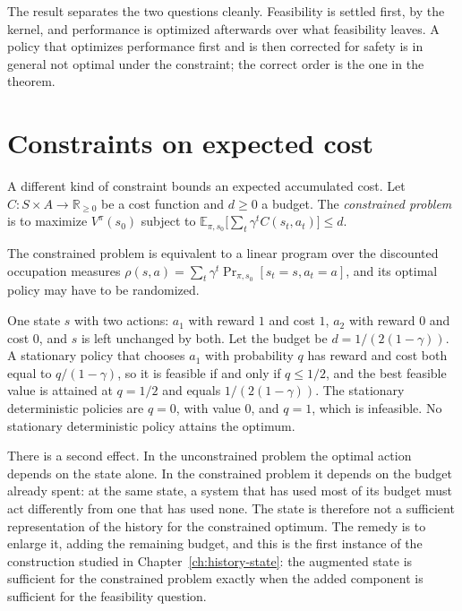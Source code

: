 The result separates the two questions cleanly. Feasibility is settled first, by the kernel, and performance is optimized afterwards over what feasibility leaves. A policy that optimizes performance first and is then corrected for safety is in general not optimal under the constraint; the correct order is the one in the theorem.

\section{Constraints on expected cost}

A different kind of constraint bounds an expected accumulated cost. Let $C:S\times A\to\mathbb R_{\ge0}$ be a cost function and $d\ge0$ a budget. The \emph{constrained problem} is to maximize $V^{\pi}(s_0)$ subject to $\mathbb E_{\pi,s_0}\bigl[\sum_t\gamma^{t}C(s_t,a_t)\bigr]\le d$.

\begin{established}
The constrained problem is equivalent to a linear program over the discounted occupation measures $\rho(s,a)=\sum_t\gamma^{t}\Pr_{\pi,s_0}[s_t=s,a_t=a]$, and its optimal policy may have to be randomized.
\end{established}

\begin{example}\label{ex:randomization}
One state $s$ with two actions: $a_1$ with reward $1$ and cost $1$, $a_2$ with reward $0$ and cost $0$, and $s$ is left unchanged by both. Let the budget be $d=1/(2(1-\gamma))$. A stationary policy that chooses $a_1$ with probability $q$ has reward and cost both equal to $q/(1-\gamma)$, so it is feasible if and only if $q\le1/2$, and the best feasible value is attained at $q=1/2$ and equals $1/(2(1-\gamma))$. The stationary deterministic policies are $q=0$, with value $0$, and $q=1$, which is infeasible. No stationary deterministic policy attains the optimum.
\end{example}

There is a second effect. In the unconstrained problem the optimal action depends on the state alone. In the constrained problem it depends on the budget already spent: at the same state, a system that has used most of its budget must act differently from one that has used none. The state is therefore not a sufficient representation of the history for the constrained optimum. The remedy is to enlarge it, adding the remaining budget, and this is the first instance of the construction studied in Chapter~\ref{ch:history-state}: the augmented state is sufficient for the constrained problem exactly when the added component is sufficient for the feasibility question.


